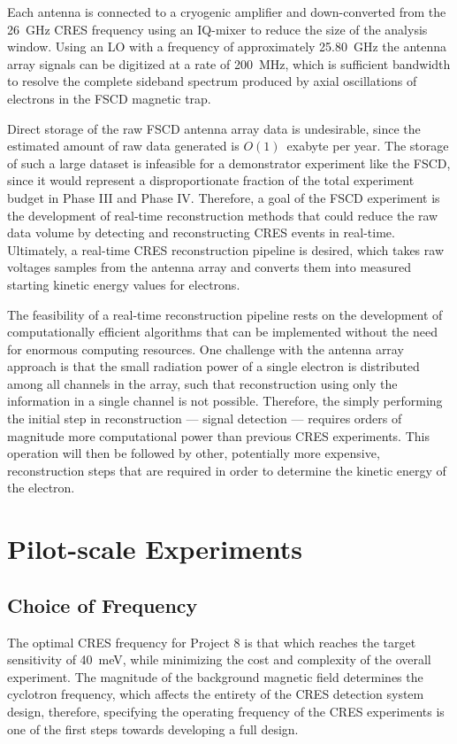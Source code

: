 Each antenna is connected to a cryogenic amplifier and down-converted from the 26~GHz CRES frequency using an IQ-mixer to reduce the size of the analysis window. Using an LO with a frequency of approximately 25.80~GHz the antenna array signals can be digitized at a rate of 200~MHz, which is sufficient bandwidth to resolve the complete sideband spectrum produced by axial oscillations of electrons in the FSCD magnetic trap. 

Direct storage of the raw FSCD antenna array data is undesirable, since the estimated amount of raw data generated is $O(1)$~exabyte per year. The storage of such a large dataset is infeasible for a demonstrator experiment like the FSCD, since it would represent a disproportionate fraction of the total experiment budget in Phase III and Phase IV. Therefore, a goal of the FSCD experiment is the development of real-time reconstruction methods that could reduce the raw data volume by detecting and reconstructing CRES events in real-time. Ultimately, a real-time CRES reconstruction pipeline is desired, which takes raw voltages samples from the antenna array and converts them into measured starting kinetic energy values for electrons.

The feasibility of a real-time reconstruction pipeline rests on the development of computationally efficient algorithms that can be implemented without the need for enormous computing resources. One challenge with the antenna array approach is that the small radiation power of a single electron is distributed among all channels in the array, such that reconstruction using only the information in a single channel is not possible. Therefore, the simply performing the initial step in reconstruction --- signal detection --- requires orders of magnitude more computational power than previous CRES experiments. This operation will then be followed by other, potentially more expensive, reconstruction steps that are required in order to determine the kinetic energy of the electron.

\section{Pilot-scale Experiments}
\label{sec:chap3-freq-choice-and-pilot-scale}

\subsection{Choice of Frequency}
The optimal CRES frequency for Project 8 is that which reaches the target sensitivity of 40~meV, while minimizing the cost and complexity of the overall experiment. The magnitude of the background magnetic field determines the cyclotron frequency, which affects the entirety of the CRES detection system design, therefore, specifying the operating frequency of the CRES experiments is one of the first steps towards developing a full design.


